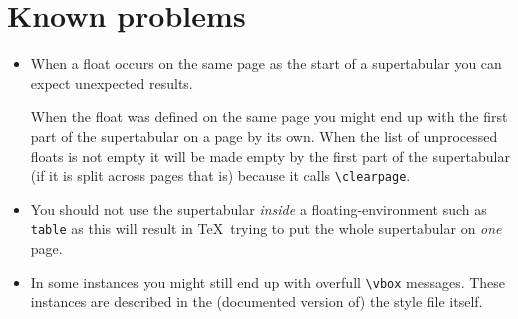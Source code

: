 \section{Known problems}
 
\begin{itemize}
\item When a float occurs on the same page as the start of a supertabular you
can expect unexpected results.
 
When the float was defined on the same page you might end up with the first
part of the supertabular on a page by its own.
When the list of unprocessed floats is not empty it will be made empty by the
first part of the supertabular (if it is split across pages that is) because it
calls \verb=\clearpage=.
\item You should not use the supertabular {\em inside\/} a floating-environment
such as {\tt table} as this will result in \TeX\ trying to put the whole
supertabular on {\em one\/} page.
\item In some instances you might still end up with overfull \verb=\vbox=
messages. These instances are described in the (documented version of) the
style file itself.
\end{itemize}
 

